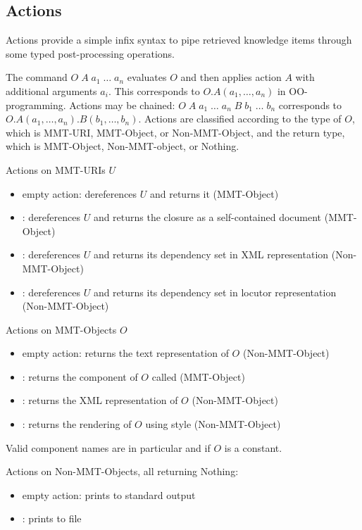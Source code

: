 \subsection{Actions}\label{sec:shell:actions}
Actions provide a simple infix syntax to pipe retrieved knowledge items through some typed post-processing operations.

The command $O\;A\;a_1\;\ldots\;a_n$ evaluates $O$ and then applies action $A$ with additional arguments $a_i$. This corresponds to $O.A(a_1,\ldots,a_n)$ in OO-programming. Actions may be chained: $O\;A\;a_1\;\ldots\;a_n \;B\;b_1\;\ldots\;b_n$ corresponds to $O.A(a_1,\ldots,a_n).B(b_1,\ldots,b_n)$. Actions are classified according to the type of $O$, which is MMT-URI, MMT-Object, or Non-MMT-Object, and the return type, which is MMT-Object, Non-MMT-object, or Nothing.
\smallskip

\noindent
Actions on MMT-URIs $U$
\begin{itemize}
\item empty action: dereferences $U$ and returns it (MMT-Object)
\item {}: dereferences $U$ and returns the closure as a self-contained document (MMT-Object)
\item {}: dereferences $U$ and returns its dependency set in XML representation (Non-MMT-Object)
\item {}: dereferences $U$ and returns its dependency set in locutor representation (Non-MMT-Object)
\end{itemize}

\noindent
Actions on MMT-Objects $O$
\begin{itemize}
\item empty action: returns the text representation of $O$ (Non-MMT-Object)
\item {}: returns the component of $O$ called  (MMT-Object)
\item {}: returns the XML representation of $O$ (Non-MMT-Object)
\item {}: returns the rendering of $O$ using style  (Non-MMT-Object)
\end{itemize}
Valid component names  are in particular  and  if $O$ is a constant.


\noindent
Actions on Non-MMT-Objects, all returning Nothing:
\begin{itemize}
\item empty action: prints to standard output
\item {}: prints to file 
\end{itemize}

